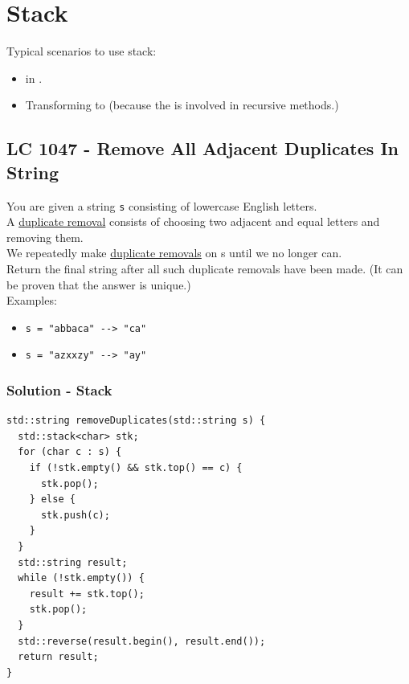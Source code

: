 \chapter{Stack}
Typical scenarios to use stack:
\begin{itemize}
	\item {\color{blue}{Bracket matching}} in {\color{blue}{expression evaluation}}.
	\item Transforming {\color{blue}{recursive methods}} to {\color{blue}{iterative methods}} (because the {\color{blue}{call stack}} is involved in recursive methods.)
\end{itemize}

\section{LC 1047 - Remove All Adjacent Duplicates In String}
You are given a string {\colorbox{CodeBackground}{\lstinline|s|}} consisting of lowercase English letters. \\

A \ul{duplicate removal} consists of choosing two adjacent and equal letters and removing them.\\

We repeatedly make \ul{duplicate removals} on s until we no longer can.\\

Return the final string after all such duplicate removals have been made. (It can be proven that the answer is unique.) \\

Examples:
\begin{itemize}
\item {\colorbox{CodeBackground}{\lstinline|s = "abbaca" --> "ca"|}}
\item {\colorbox{CodeBackground}{\lstinline|s = "azxxzy" --> "ay"|}}
\end{itemize}

\subsection*{Solution - Stack}
\begin{lstlisting}
std::string removeDuplicates(std::string s) {
  std::stack<char> stk;
  for (char c : s) {
    if (!stk.empty() && stk.top() == c) {
      stk.pop();
    } else {
      stk.push(c);
    }
  }
  std::string result;
  while (!stk.empty()) {
    result += stk.top();
    stk.pop();
  }
  std::reverse(result.begin(), result.end());
  return result;
}
\end{lstlisting}

